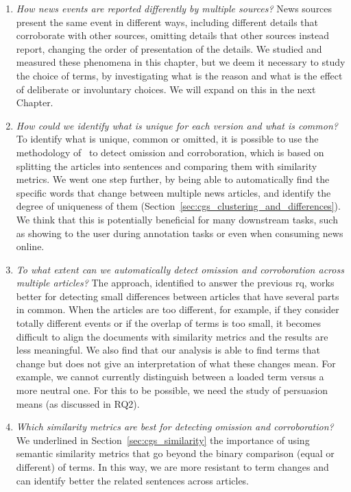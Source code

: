 \begin{enumerate}[label={\textbf{RQ1.\arabic*:}},leftmargin=2cm]
    \item \emph{How news events are reported differently by multiple sources?} News sources present the same event in different ways, including different details that corroborate with other sources, omitting details that other sources instead report, changing the order of presentation of the details. We studied and measured these phenomena in this chapter, but we deem it necessary to study the choice of terms, by investigating what is the reason and what is the effect of deliberate or involuntary choices. We will expand on this in the next Chapter.
    \item \emph{How could we identify what is unique for each version and what is common?} To identify what is unique, common or omitted, it is possible to use the methodology of~\citet{bountouridis2018explaining} to detect omission and corroboration, %
    which is based on splitting the articles into sentences and comparing them with similarity metrics.
    We went one step further, by being able to automatically find the specific words that change between multiple news articles, and identify the degree of uniqueness of them (Section~\ref{sec:cgs_clustering_and_differences}). We think that this is potentially beneficial for many downstream tasks, such as showing to the user during annotation tasks or even when consuming news online.
    \item \emph{To what extent can we automatically detect omission and corroboration across multiple articles?} The approach, identified to answer the previous \acrshort{rq}, works better for detecting small differences between articles that have several parts in common. When the articles are too different, for example, if they consider totally different events or if the overlap of terms is too small, it becomes difficult to align the documents with similarity metrics and the results are less meaningful. We also find that our analysis is able to find terms that change but does not give an interpretation of what these changes mean. For example, we cannot currently distinguish between a loaded term versus a more neutral one. For this to be possible, we need the study of persuasion means (as discussed in RQ2).
    \item \emph{Which similarity metrics are best for detecting omission and corroboration?} We underlined in Section~\ref{sec:cgs_similarity} the importance of using semantic similarity metrics that go beyond the binary comparison (equal or different) of terms. In this way, we are more resistant to term changes and can identify better the related sentences across articles.
\end{enumerate}

